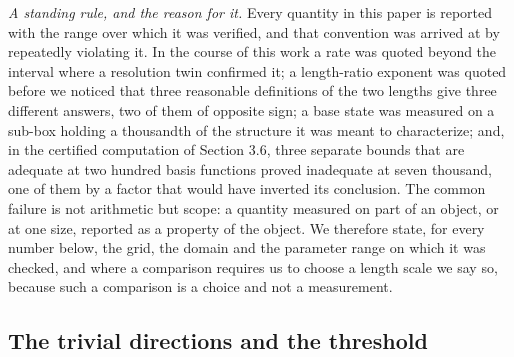 \documentclass[11pt]{article}
\begin{document}
\emph{A standing rule, and the reason for it.} Every quantity in this paper is reported with the range over which it was verified, and that convention was arrived at by repeatedly violating it. In the course of this work a rate was quoted beyond the interval where a resolution twin confirmed it; a length-ratio exponent was quoted before we noticed that three reasonable definitions of the two lengths give three different answers, two of them of opposite sign; a base state was measured on a sub-box holding a thousandth of the structure it was meant to characterize; and, in the certified computation of Section 3.6, three separate bounds that are adequate at two hundred basis functions proved inadequate at seven thousand, one of them by a factor that would have inverted its conclusion. The common failure is not arithmetic but scope: a quantity measured on part of an object, or at one size, reported as a property of the object. We therefore state, for every number below, the grid, the domain and the parameter range on which it was checked, and where a comparison requires us to choose a length scale we say so, because such a comparison is a choice and not a measurement.

\subsection{The trivial directions and the threshold}
\end{document}
